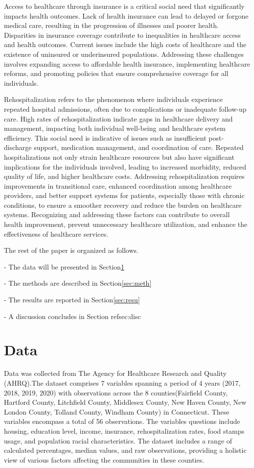\documentclass[12pt]{article}
\begin{document}
Access to healthcare through insurance
is a critical social need that significantly
impacts health outcomes. Lack of health
insurance can lead to delayed or forgone
medical care, resulting in the progression
of illnesses and poorer health.
Disparities in insurance coverage contribute
to inequalities in healthcare access and
health outcomes. Current issues include
the high costs of healthcare and the
existence of uninsured or underinsured
populations. Addressing these challenges
involves expanding access to affordable
health insurance, implementing healthcare
reforms, and promoting policies that
ensure comprehensive coverage for all
individuals.

Rehospitalization refers to the phenomenon
where individuals experience repeated
hospital admissions, often due to
complications or inadequate follow-up care.
High rates of rehospitalization indicate
gaps in healthcare delivery and management,
impacting both individual well-being and
healthcare system efficiency. This social
need is indicative of issues such as
insufficient post-discharge support,
medication management, and coordination
of care. Repeated hospitalizations not
only strain healthcare resources but also
have significant implications for the
individuals involved, leading to increased
morbidity, reduced quality of life, and
higher healthcare costs. Addressing
rehospitalization requires improvements
in transitional care, enhanced coordination
among healthcare providers, and better
support systems for patients, especially
those with chronic conditions, to ensure
a smoother recovery and reduce the burden
on healthcare systems. Recognizing and
addressing these factors can contribute
to overall health improvement, prevent
unnecessary healthcare utilization, and
enhance the effectiveness of healthcare
services.

The rest of the paper is organized as follows.

- The data will be presented in Section\ref{sec:data}

- The methods are described in Section\ref{sec:meth}

- The results are reported in Section\ref{sec:resu}

- A discussion concludes in Section ref{sec:disc}

\section{Data}\label{sec:data}

Data was collected from The Agency for Healthcare Research and Quality (AHRQ).The dataset comprises 7 variables 
spanning a period of 4 years (2017, 2018, 2019, 2020) with observations across the 8 counties(Fairfield County, Hartford County, 
Litchfield County, Middlesex County, New Haven County, New London County, Tolland County, Windham County) in Connecticut. These variables 
encompass a total of 56 observations. The variables questions include housing, education level, income, insurance,
rehospitalization rates, food stamps usage, and population racial characteristics. The dataset includes a range of 
calculated percentages, median values, and raw observations, providing a holistic view of various factors affecting 
the communities in these counties. 
\end{document}
